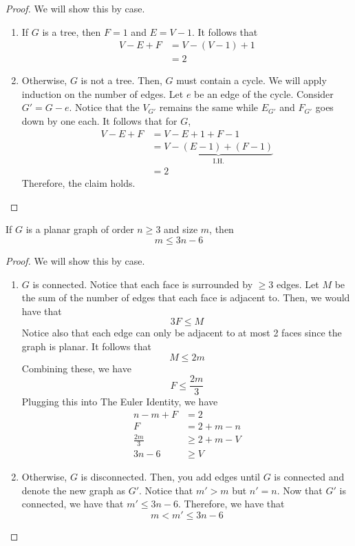 \begin{proof}
  We will show this by case.
  \begin{enumerate}
    \item If \(G\) is a tree, then \(F=1\) and \(E=V-1\). It
      follows that
      \[
        \begin{aligned}
          V-E+F &= V-(V-1)+1 \\
                &= 2
        \end{aligned}
      \]

    \item Otherwise, \(G\) is not a tree. Then, \(G\) must
      contain a cycle.
      We will apply induction on the number of edges.
      Let \(e\) be an edge of the cycle.
      Consider \(G' = G-e\). Notice that the \(V_{G'}\) remains
      the same while \(E_{G'}\) and \(F_{G'}\) goes down by one
      each. It follows that for \(G\),
      \[
        \begin{aligned}
          V - E + F &= V - E + 1 + F - 1 \\
                    &= \underbrace{V-(E-1)+(F-1)}_\text{I.H.} \\
                    &= 2 
        \end{aligned}
      \]
      Therefore, the claim holds.
  \end{enumerate}
\end{proof}

\begin{theorem}
  If \(G\) is a planar graph of order \(n \geq 3\) and size
  \(m\), then
  \[ m \leq 3 n-6 \]
\end{theorem}

\begin{proof}
  We will show this by case. 
  \begin{enumerate}
    \item \(G\) is connected. Notice that each face
      is surrounded by \(\geq 3\) edges. Let \(M\) be the 
      sum of the number of edges that each face is adjacent to. 
      Then, we would have that 
      \[ 3F \leq M \]
      Notice also that each edge can only be adjacent to at most
      2 faces since the graph is planar. It follows that
      \[ M \leq 2m \]
      Combining these, we have
      \[ F \leq \frac{2m}{3} \]
      Plugging this into The Euler Identity, we have
      \[
        \begin{aligned}
          n - m + F &= 2 \\
          F &= 2 + m - n \\
          \frac{2m}{3} &\geq 2 + m - V \\
          3n - 6 &\geq V
        \end{aligned}
      \]

    \item Otherwise, \(G\) is disconnected. Then, you add edges
      until \(G\) is connected and denote the new graph as
      \(G'\). Notice that \(m' > m\) but \(n' = n\). Now that
      \(G'\) is connected, we have that \(m' \leq 3n-6\).
      Therefore, we have that
      \[ m < m' \leq 3n-6 \]
  \end{enumerate}
\end{proof}

